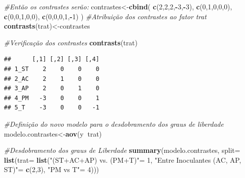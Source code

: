 \documentclass[
]{book}
\newenvironment{Shaded}{\begin{snugshade}}{\end{snugshade}}
\newcommand{\CommentTok}[1]{\textcolor[rgb]{0.56,0.35,0.01}{\textit{#1}}}
\newcommand{\DataTypeTok}[1]{\textcolor[rgb]{0.13,0.29,0.53}{#1}}
\newcommand{\DecValTok}[1]{\textcolor[rgb]{0.00,0.00,0.81}{#1}}
\newcommand{\KeywordTok}[1]{\textcolor[rgb]{0.13,0.29,0.53}{\textbf{#1}}}
\newcommand{\NormalTok}[1]{#1}
\newcommand{\OperatorTok}[1]{\textcolor[rgb]{0.81,0.36,0.00}{\textbf{#1}}}
\newcommand{\StringTok}[1]{\textcolor[rgb]{0.31,0.60,0.02}{#1}}
\begin{document}
\begin{Shaded}
\begin{Highlighting}[]
\CommentTok{#Então os contrastes serão:}
\NormalTok{contrastes<-}\KeywordTok{cbind}\NormalTok{(}
                  \KeywordTok{c}\NormalTok{(}\DecValTok{2}\NormalTok{,}\DecValTok{2}\NormalTok{,}\DecValTok{2}\NormalTok{,}\OperatorTok{-}\DecValTok{3}\NormalTok{,}\OperatorTok{-}\DecValTok{3}\NormalTok{),}
                  \KeywordTok{c}\NormalTok{(}\DecValTok{0}\NormalTok{,}\DecValTok{1}\NormalTok{,}\DecValTok{0}\NormalTok{,}\DecValTok{0}\NormalTok{,}\DecValTok{0}\NormalTok{),}
                  \KeywordTok{c}\NormalTok{(}\DecValTok{0}\NormalTok{,}\DecValTok{0}\NormalTok{,}\DecValTok{1}\NormalTok{,}\DecValTok{0}\NormalTok{,}\DecValTok{0}\NormalTok{),}
                  \KeywordTok{c}\NormalTok{(}\DecValTok{0}\NormalTok{,}\DecValTok{0}\NormalTok{,}\DecValTok{0}\NormalTok{,}\DecValTok{1}\NormalTok{,}\OperatorTok{-}\DecValTok{1}\NormalTok{)}
\NormalTok{                    )}
\CommentTok{#Atribuição dos contrastes ao fator trat}
\KeywordTok{contrasts}\NormalTok{(trat)<-contrastes}

\CommentTok{#Verificação dos contrastes}
\KeywordTok{contrasts}\NormalTok{(trat)}
\end{Highlighting}
\end{Shaded}

\begin{verbatim}
##      [,1] [,2] [,3] [,4]
## 1_ST    2    0    0    0
## 2_AC    2    1    0    0
## 3_AP    2    0    1    0
## 4_PM   -3    0    0    1
## 5_T    -3    0    0   -1
\end{verbatim}

\begin{Shaded}
\begin{Highlighting}[]
\CommentTok{#Definição do novo modelo para o desdobramento dos graus de liberdade}
\NormalTok{modelo.contrastes<-}\KeywordTok{aov}\NormalTok{(y}\OperatorTok{~}\NormalTok{trat)}

\CommentTok{#Desdobramento dos graus de Liberdade}
\KeywordTok{summary}\NormalTok{(modelo.contrastes, }
        \DataTypeTok{split=} \KeywordTok{list}\NormalTok{(}\DataTypeTok{trat=} 
                      \KeywordTok{list}\NormalTok{(}\StringTok{"(ST+AC+AP) vs. (PM+T)"}\NormalTok{=}\StringTok{ }\DecValTok{1}\NormalTok{, }
                           \StringTok{"Entre Inoculantes (AC, AP, ST)"}\NormalTok{=}\StringTok{ }\KeywordTok{c}\NormalTok{(}\DecValTok{2}\NormalTok{,}\DecValTok{3}\NormalTok{), }
                           \StringTok{"PM vs T"}\NormalTok{=}\StringTok{ }\DecValTok{4}\NormalTok{)))}
\end{Highlighting}
\end{Shaded}
\end{document}
